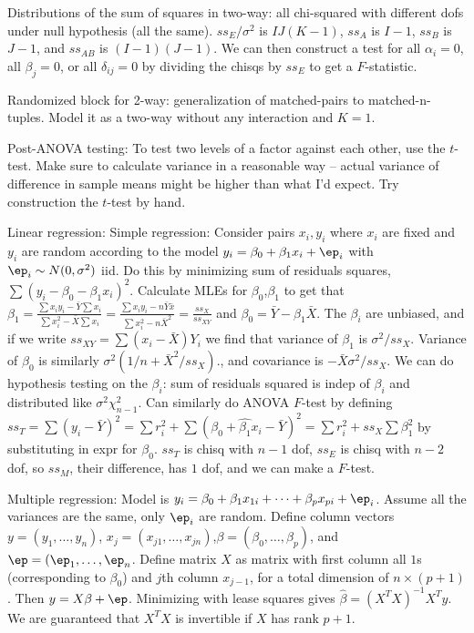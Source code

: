 \documentclass{article}
\begin{document}
Distributions of the sum of squares in two-way: all chi-squared with different dofs under null hypothesis (all the same). $ss_E/\sigma^2$ is $IJ(K-1)$, $ss_A$ is $I-1$, $ss_B$ is $J-1$, and $ss_{AB}$ is $(I-1)(J-1)$. We can then construct a test for all $\alpha_i=0$, all $\beta_j=0$, or all $\delta_{ij}=0$ by dividing the chisqs by $ss_E$ to get a $F$-statistic. 

Randomized block for 2-way: generalization of matched-pairs to matched-n-tuples. Model it as a two-way without any interaction and $K=1$. 

Post-ANOVA testing: To test two levels of a factor against each other, use the $t$-test. Make sure to calculate variance in a reasonable way -- actual variance of difference in sample means might be higher than what I'd expect. Try construction the $t$-test by hand.

Linear regression: Simple regression: Consider pairs $x_i,y_i$ where $x_i$ are fixed and $y_i$ are random according to the model $y_i=\beta_0+\beta_1x_i+\ep_i$ with $\ep_i\sim N(0,\sigma^2)$ iid. Do this by minimizing sum of residuals squares, $\sum(y_i-\beta_0-\beta_1x_i)^2$. Calculate MLEs for $\beta_0$,$\beta_1$ to get that $\beta_1=\frac{\sum x_iy_i-\bar{Y}\sum x_i}{\sum x_i^2-\bar{X}\sum x_i}=\frac{\sum x_iy_i-n\bar{Y}\bar{x}}{\sum x_i^2-n\bar{X}^2}=\frac{ss_X}{ss_{XY}}$ and $\beta_0=\bar{Y}-\beta_1\bar{X}$. The $\beta_i$ are unbiased, and if we write $ss_{XY}=\sum(x_i-\bar{X})Y_i$ we find that variance of $\beta_1$ is $\sigma^2/ss_X$. Variance of $\beta_0$ is similarly $\sigma^2(1/n+\bar{X}^2/ss_X)$., and covariance is $-\bar{X}\sigma^2/ss_X$. We can do hypothesis testing on the $\beta_i$: sum of residuals squared is indep of $\beta_i$ and distributed like $\sigma^2\chi^2_{n-1}$. Can similarly do ANOVA $F$-test by defining $ss_T=\sum(y_i-\bar{Y})^2=\sum r_i^2+\sum(\widehat{\beta_0}+\widehat{\beta_1}x_i-\bar{Y})^2=\sum r_i^2+ss_X\sum\beta_1^2$ by substituting in expr for $\beta_0$. $ss_T$ is chisq with $n-1$ dof, $ss_E$ is chisq with $n-2$ dof, so $ss_M$, their difference, has $1$ dof, and we can make a $F$-test. 

Multiple regression: Model is $y_i=\beta_0+\beta_1x_{1i}+\cdots+\beta_px_{pi}+\ep_i$. Assume all the variances are the same, only $\ep_i$ are random. Define column vectors $y=(y_1,\ldots,y_n)$, $x_j=(x_{j1},\ldots,x_{jn})$,$\beta=(\beta_0,\ldots,\beta_p)$, and $\ep=(\ep_1,\ldots,\ep_n$. Define matrix $X$ as matrix with first column all $1$s (corresponding to $\beta_0$) and $j$th column $x_{j-1}$, for a total dimension of $n\times(p+1)$. Then $y=X\beta+\ep$. Minimizing with lease squares gives $\widehat{\beta}=(X^TX)^{-1}X^Ty$. We are guaranteed that $X^TX$ is invertible if $X$ has rank $p+1$. 
\end{document}
